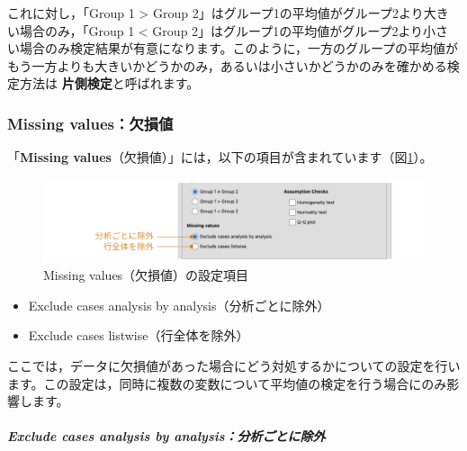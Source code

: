 \documentclass[
  12pt,
  a5jpaper,
  lualatex, ja=standard]{bxjsbook}
\providecommand{\tightlist}{%
  \setlength{\itemsep}{0pt}\setlength{\parskip}{0pt}}
\renewcommand{\emph}[1]{\textbf{\color{emph} #1}}
\newenvironment{jmvsettings}{%
	\begin{center}%
	\begin{tcolorbox}[%
		title=設定項目,
		colframe=gmoji,
		colbacktitle=gmoji,
		colback=gmoji!2!white,
		breakable,
		width=.9\textwidth,
		]\small\addtolength{\leftmargini}{-3\labelsep}%
	}%
	{\end{tcolorbox}\end{center}}
\begin{document}
これに対し，「Group 1 \textgreater{} Group 2」はグループ1の平均値がグループ2より大きい場合のみ，「Group 1 \textless{} Group 2」はグループ1の平均値がグループ2より小さい場合のみ検定結果が有意になります。このように，一方のグループの平均値がもう一方よりも大きいかどうかのみ，あるいは小さいかどうかのみを確かめる検定方法は\emph{片側検定}と呼ばれます。

\hypertarget{subsub:ttest-missing-values}{%
\subsubsection*{Missing values：欠損値}\label{subsub:ttest-missing-values}}

「\textbf{Missing values}（欠損値）」には，以下の項目が含まれています（図\ref{fig:ttests-missing-values}）。

\begin{figure}[!ht]

{\centering \includegraphics[width=1\linewidth]{images/ttests/missing-values} 

}

\caption{Missing values（欠損値）の設定項目}\label{fig:ttests-missing-values}
\end{figure}

\begin{jmvsettings}

\begin{itemize}
\tightlist
\item
  Exclude cases analysis by analysis（分析ごとに除外）
\item
  Exclude cases listwise（行全体を除外）
\end{itemize}

\end{jmvsettings}

ここでは，データに欠損値があった場合にどう対処するかについての設定を行います。この設定は，同時に複数の変数について平均値の検定を行う場合にのみ影響します。

\hypertarget{exclude-cases-analysis-by-analysisux5206ux6790ux3054ux3068ux306bux9664ux5916}{%
\subparagraph*{Exclude cases analysis by analysis：分析ごとに除外}\label{exclude-cases-analysis-by-analysisux5206ux6790ux3054ux3068ux306bux9664ux5916}}
\end{document}
